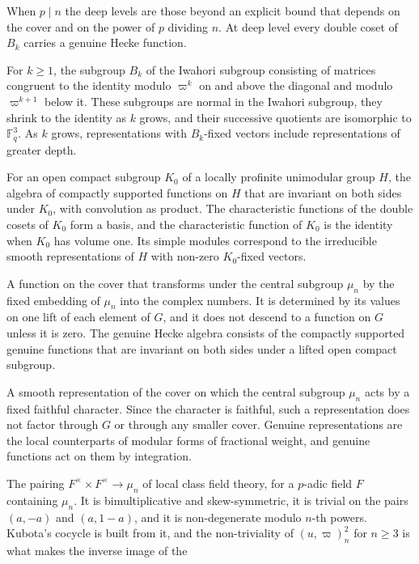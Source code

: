 \documentclass[12pt,letterpaper]{amsart}
\numberwithin{equation}{section}
\theoremstyle{definition}
\theoremstyle{remark}
\newcommand{\Fq}{\mathbb{F}_q}
\begin{document}
\begin{description}[leftmargin=1.5em,style=nextline]
When $p\mid n$ the deep levels are those beyond an explicit bound that
depends on the cover and on the power of $p$ dividing $n$. At deep level
every double coset of $B_k$ carries a genuine Hecke function.
\item[Filtration subgroup] For $k\geq 1$, the subgroup $B_k$ of the
Iwahori subgroup consisting of matrices congruent to the identity modulo
$\varpi^k$ on and above the diagonal and modulo $\varpi^{k+1}$ below it.
These subgroups are normal in the Iwahori subgroup, they shrink to the
identity as $k$ grows, and their successive quotients are isomorphic to
$\Fq^3$. As $k$ grows, representations with $B_k$-fixed vectors include
representations of greater depth.
\item[Generalized Hecke algebra] For an open compact subgroup $K_0$ of
a locally profinite unimodular group $H$, the algebra of compactly
supported functions on $H$ that are invariant on both sides under $K_0$,
with convolution as product. The characteristic functions of the double
cosets of $K_0$ form a basis, and the characteristic function of $K_0$
is the identity when $K_0$ has volume one. Its simple modules correspond
to the irreducible smooth representations of $H$ with non-zero
$K_0$-fixed vectors.
\item[Genuine function] A function on the cover that transforms under
the central subgroup $\mu_n$ by the fixed embedding of $\mu_n$ into the
complex numbers. It is determined by its values on one lift of each
element of $G$, and it does not descend to a function on $G$ unless it
is zero. The genuine Hecke algebra consists of the compactly supported
genuine functions that are invariant on both sides under a lifted open
compact subgroup.
\item[Genuine representation] A smooth representation of the cover on
which the central subgroup $\mu_n$ acts by a fixed faithful character.
Since the character is faithful, such a representation does not factor
through $G$ or through any smaller cover. Genuine representations are
the local counterparts of modular forms of fractional weight, and
genuine functions act on them by integration.
\item[Hilbert symbol] The pairing $F^\times\times F^\times\to\mu_n$ of
local class field theory, for a $p$-adic field $F$ containing $\mu_n$. It
is bimultiplicative and skew-symmetric, it is trivial on the pairs
$(a,-a)$ and $(a,1-a)$, and it is non-degenerate modulo $n$-th powers.
Kubota's cocycle is built from it, and the non-triviality of
$(u,\varpi)_n^2$ for $n\geq 3$ is what makes the inverse image of the

\end{description}
\end{document}
